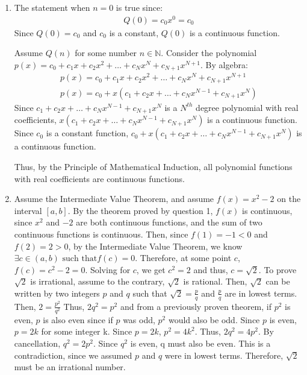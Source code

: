 \documentclass[10pt]{exam}
\begin{document}
\newcommand{\dd}{\textrm{d}}
\newcommand{\NN}{\mathbb N}
\newcommand{\CC}{\mathbb C}
\newcommand{\QQ}{\mathbb Q}
\newcommand{\ZZ}{\mathbb Z}
\newcommand{\RR}{\mathbb R}
\newcommand{\proofdone}{\hfill $\square$}

\vskip 0.5cm
\begin{enumerate}
    \item 
        The statement when $n = 0$ is true since: 
        \begin{gather}
            Q(0) = c_0x^0 = c_0
        \end{gather}
        Since $Q(0) = c_0$ and $c_0$ is a constant, $Q(0)$ is a continuous function.

        Assume $Q(n)$ for some number $n\in \NN$. Consider the polynomial 
        $p(x) = c_0 + c_1x + c_2x^2 + \dots + c_Nx^N + c_{N+1}x^{N+1}$. By algebra: 
        \begin{gather*}
            p(x) = c_0 + c_1x + c_2x^2 + \dots + c_Nx^N + c_{N+1}x^{N+1}\\
            p(x) = c_0 + x(c_1 + c_2x + \dots + c_Nx^{N-1} + c_{N+1}x^{N})
        \end{gather*}
        Since $c_1 + c_2x + \dots + c_Nx^{N-1} + c_{N+1}x^{N}$ is a $N^{th}$ degree
        polynomial with real coefficients, $x(c_1 + c_2x + \dots + c_Nx^{N-1} + c_{N+1}x^{N})$
        is a continuous function. Since $c_0$ is a constant function, $c_0 + x(c_1 + c_2x + \dots + c_Nx^{N-1} + c_{N+1}x^{N})$ 
        is a continuous function. 

        Thus, by the Principle of Mathematical Induction, all polynomial functions with real 
        coefficients are continuous functions. 

    
    \pagebreak
    \item 
    Assume the Intermediate Value Theorem, and assume $f(x) = x^2 - 2$ on the interval 
    $[a, b]$. By the theorem proved by question 1, $f(x)$ is continuous, since $x^2$ and 
    $-2$ are both continuous functions, and the sum of two continuous functions is continuous.
    Then, since $f(1) = -1 < 0$ and $f(2) = 2 > 0$, by the Intermediate Value Theorem, 
    we know $\exists c \in (a, b) \text{ such that} f(c) = 0$. Therefore, at some point $c$, 
    $f(c) = c^2 - 2 = 0$. Solving for $c$, we get $c^2 = 2$ and thus, $c = \sqrt{2}$. 
    To prove $\sqrt{2}$ is irrational, assume to the contrary, $\sqrt{2}$ is rational. 
    Then, $\sqrt{2}$ can be written by two integers $p$ and $q$ such that 
    $\sqrt{2} = \frac{p}{q}$ and $\frac{p}{q}$ are in lowest terms. Then, $2 = \frac{p^2}{q^2}$
    Thus, $2q^2 = p^2$ and from a previously proven theorem, if $p^2$ is even, $p$ is also even since 
    if $p$ was odd, $p^2$ would also be odd. Since $p$ is even, $p = 2k$ for some integer k. 
    Since $p = 2k$, $p^2 = 4k^2$. Thus, $2q^2 = 4p^2$. By cancellation, $q^2 = 2p^2$. Since 
    $q^2$ is even, q must also be even. This is a contradiction, since we assumed $p$ and $q$ 
    were in lowest terms. Therefore, $\sqrt{2}$ must be an irrational number. 


\end{enumerate}
\end{document}
